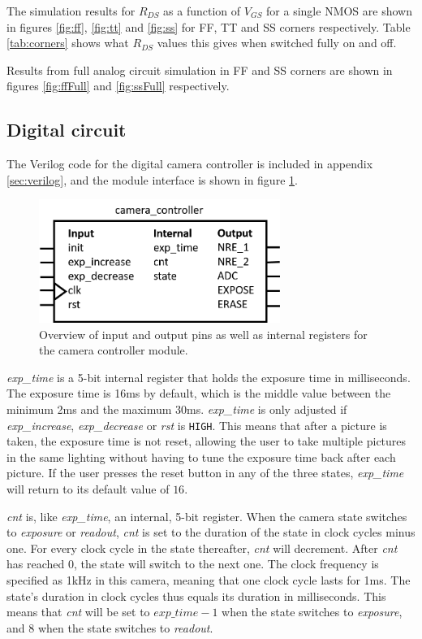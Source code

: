 The simulation results for $R_{DS}$ as a function of $V_{GS}$ for a single NMOS are shown in figures \ref{fig:ff}, \ref{fig:tt} and \ref{fig:ss} for FF, TT and SS corners respectively. Table \ref{tab:corners} shows what $R_{DS}$ values this gives when switched fully on and off.

Results from full analog circuit simulation in FF and SS corners are shown in figures \ref{fig:ffFull} and \ref{fig:ssFull} respectively.

\subsection{Digital circuit}

The Verilog code for the digital camera controller is included in appendix \ref{sec:verilog}, and the module interface is shown in figure \ref{fig:digitalModule}.

\begin{figure}[H]
    \centering
    \includegraphics[width=0.7\textwidth]{graphs/camera_controller_pinout_with_internal.png}
    \caption{Overview of input and output pins as well as internal registers for the camera controller module.}
    \label{fig:digitalModule}
\end{figure}

\emph{exp\_time} is a 5-bit internal register that holds the exposure time in milliseconds. The exposure time is 16ms by default, which is the middle value between the minimum 2ms and the maximum 30ms. \emph{exp\_time} is only adjusted if \emph{exp\_increase}, \emph{exp\_decrease} or \emph{rst} is \verb|HIGH|. This means that after a picture is taken, the exposure time is not reset, allowing the user to take multiple pictures in the same lighting without having to tune the exposure time back after each picture. If the user presses the reset button in any of the three states, \emph{exp\_time} will return to its default value of $16$.

\emph{cnt} is, like \emph{exp\_time}, an internal, 5-bit register. When the camera state switches to \emph{exposure} or \emph{readout}, \emph{cnt} is set to the duration of the state in clock cycles minus one. For every clock cycle in the state thereafter, \emph{cnt} will decrement. After \emph{cnt} has reached $0$, the state will switch to the next one. The clock frequency is specified as 1kHz in this camera, meaning that one clock cycle lasts for 1ms. The state's duration in clock cycles thus equals its duration in milliseconds. This means that \emph{cnt} will be set to $exp\_time - 1$ when the state switches to \emph{exposure}, and $8$ when the state switches to \emph{readout}.

